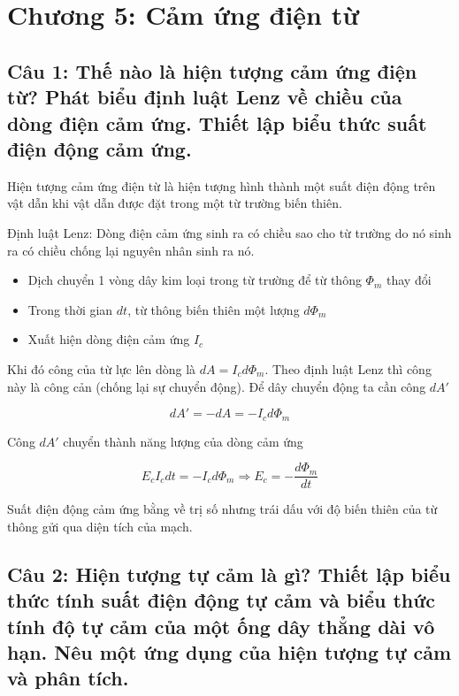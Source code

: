 \section[Chương 5]{Chương 5: Cảm ứng điện từ}

\subsection[Câu 1]{Câu 1: Thế nào là hiện tượng cảm ứng điện từ? Phát biểu định luật Lenz về chiều của dòng điện cảm ứng. Thiết lập biểu thức suất điện động cảm ứng.}

Hiện tượng cảm ứng điện từ là hiện tượng hình thành một suất điện động trên vật dẫn khi vật dẫn được đặt trong một từ trường biến thiên.

Định luật Lenz: Dòng điện cảm ứng sinh ra có chiều sao cho từ trường do nó sinh ra có chiều chống lại nguyên nhân sinh ra nó.

\begin{itemize}
  \item Dịch chuyển 1 vòng dây kim loại trong từ trường để từ thông $\Phi_m$ thay đổi
  \item Trong thời gian $dt$, từ thông biến thiên một lượng $d\Phi_m$
  \item Xuất hiện dòng điện cảm ứng $I_c$
\end{itemize}

Khi đó công của từ lực lên dòng là $dA = I_cd\Phi_m$. Theo định luật Lenz thì công này là công cản (chống lại sự chuyển động). Để dây chuyển động ta cần công $dA'$

\begin{equation*}
  dA' = -dA = -I_cd\Phi_m
\end{equation*}

Công $dA'$ chuyển thành năng lượng của dòng cảm ứng

\begin{equation*}
  E_cI_cdt = -I_cd\Phi_m \Rightarrow E_c = -\frac{d\Phi_m}{dt}
\end{equation*}

Suất điện động cảm ứng bằng về trị số nhưng trái dấu với độ biến thiên của từ thông gửi qua diện tích của mạch.

\subsection[Câu 2]{Câu 2: Hiện tượng tự cảm là gì? Thiết lập biểu thức tính suất điện động tự cảm và biểu thức tính độ tự cảm của một ống dây thẳng dài vô hạn. Nêu một ứng dụng của hiện tượng tự cảm và phân tích.}

